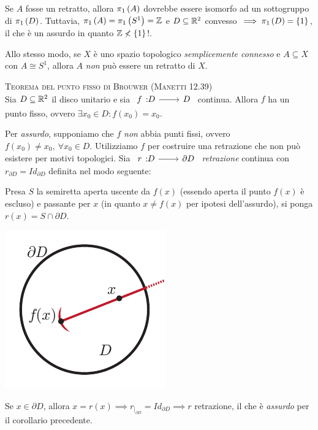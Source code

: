 \begin{demonstration}
	Se $A$ fosse un retratto, allora $\gruf{A}{\ }$ dovrebbe essere isomorfo ad un sottogruppo di $\gruf{D}{\ }$. Tuttavia, $\gruf{A}{\ }=\gruf{S^1}{\ }=\integerset$ e $D\subseteq\mathbb{R}^2$ convesso $\implies \gruf{D}{\ }=\left\{1\right\}$, il che è un assurdo in quanto $\mathbb{Z}\nless \left\{1\right\}$!.
\end{demonstration}
\begin{observe}
	Allo stesso modo, se $X$ è uno spazio topologico \textit{semplicemente connesso} e $A\subseteq X$ con $A\cong S^1$, allora $A$ \textit{non} può essere un retratto di $X$.
\end{observe}

\begin{corollary} \textsc{Teorema del punto fisso di Brouwer (Manetti 12.39)} \label{punto fisso B}   \\
	Sia $D\subseteq \mathbb{R}^2$ il disco unitario e sia $\funz f D D$ continua. Allora $f$ ha un punto fisso, ovvero $\exists x_0\in D \colon f(x_0)=x_0$.
\end{corollary}
\begin{demonstration}
	Per \textit{assurdo}, supponiamo che $f$ \textit{non} abbia punti fissi, ovvero $f(x_0)\neq x_0,\ \forall x_0\in D$. Utilizziamo $f$ per costruire una retrazione che non può esistere per motivi topologici. Sia $\funz r D {\partial{D}}$ \textit{retrazione} continua con $r_{\partial{D}}=Id_{\partial{D}}$ definita nel modo seguente:\\
	\begin{minipage}{.82\linewidth}
		\begin{center}
			Presa $S$ la semiretta aperta uscente da $f(x)$ (essendo aperta il punto $f(x)$ è escluso) e passante per $x$ (in quanto $x\neq f(x)$ per ipotesi dell'assurdo), si ponga $r(x)=S\cap\partial{D}$.
		\end{center} 
	\end{minipage}
\begin{minipage}{.17\linewidth}
	\includegraphics[trim=0cm 0cm 0cm 0cm,clip,scale=0.5]{images/brower.pdf}
\end{minipage}
Se $x\in\partial{D}$, allora $x=r(x) \implies r_{\mid_{\partial{D}}}= Id_{\partial{D}} \implies r$ retrazione, il che è \textit{assurdo} per il corollario precedente.
\end{demonstration}
